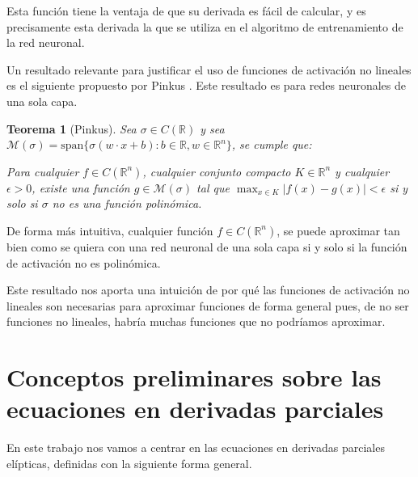 \documentclass[a4paper,11pt,spanish, twoside, leqno]{tfg-uam}
\newtheorem{teor}{Teorema}[chapter]
\theoremstyle{definition}
\begin{document}
Esta función tiene la ventaja de que su derivada es fácil de calcular, y es precisamente esta derivada la que se utiliza en el algoritmo de entrenamiento de la red neuronal.

Un resultado relevante para justificar el uso de funciones de activación no lineales es el siguiente propuesto por Pinkus \cite[Theorem 3.1]{pinkus1999approximation}. Este resultado es para redes neuronales de una sola capa.

\begin{teor}[Pinkus]
    Sea $\sigma\in C(\mathbb{R})$ y sea $\mathcal{M}(\sigma) = \text{span}\{\sigma(w\cdot x + b): b \in \mathbb{R}, w \in \mathbb{R}^n\}$, se cumple que:
    
    Para cualquier $f \in C(\mathbb{R}^n)$, cualquier conjunto compacto $K\in \mathbb{R}^n$ y cualquier $\epsilon > 0$, existe una función $g\in \mathcal{M}(\sigma)$ tal que $\max_{x\in K}|f(x)-g(x)|<\epsilon$ si y solo si $\sigma$ no es una función polinómica.
\end{teor}
De forma más intuitiva, cualquier función $f \in C(\mathbb{R}^n)$, se puede aproximar tan bien como se quiera con una red neuronal de una sola capa si y solo si la función de activación no es polinómica.

Este resultado nos aporta una intuición de por qué las funciones de activación no lineales son necesarias para aproximar funciones de forma general pues, de no ser funciones no lineales, habría muchas funciones que no podríamos aproximar. 

\section{Conceptos preliminares sobre las ecuaciones en derivadas parciales} \label{sec:EDPs}

En este trabajo nos vamos a centrar en las ecuaciones en derivadas parciales elípticas, definidas con la siguiente forma general.
\end{document}
